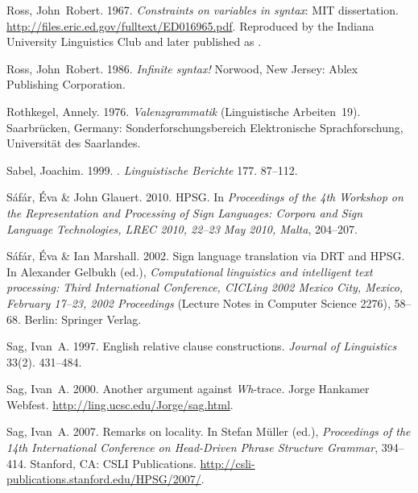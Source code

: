 \begin{thebibliography}{1420}
Ross, John~Robert. 1967.
\newblock \emph{Constraints on variables in syntax}: MIT dissertation.
\newblock \urlprefix\url{http://files.eric.ed.gov/fulltext/ED016965.pdf}.
\newblock Reproduced by the Indiana University Linguistics Club and later
  published as .

Ross, John~Robert. 1986.
\newblock \emph{Infinite syntax!}
\newblock Norwood, New Jersey: Ablex Publishing Corporation.

Rothkegel, Annely. 1976.
\newblock \emph{Valenzgrammatik} (Linguistische Arbeiten~19).
\newblock Saarbr{\"u}cken, Germany: Sonderforschungsbereich Elektronische
  Sprachforschung, Universit{\"a}t des Saarlandes.

Sabel, Joachim. 1999.
.
\newblock \emph{Linguistische Berichte} 177. 87--112.

S{\'a}f{\'a}r, {\'E}va \& John Glauert. 2010.
 {HPSG}.
\newblock In \emph{Proceedings of the {4th Workshop on the Representation and
  Processing of Sign Languages: Corpora and Sign Language Technologies, LREC
  2010, 22--23 May 2010, Malta}}, 204--207.

S{\'a}f{\'a}r, {\'E}va \& Ian Marshall. 2002.
\newblock Sign language translation via {DRT} and {HPSG}.
\newblock In Alexander Gelbukh (ed.), \emph{Computational linguistics and
  intelligent text processing: {Third International Conference, CICLing 2002
  Mexico City, Mexico, February 17--23, 2002 Proceedings}} (Lecture Notes in
  Computer Science 2276), 58--68. Berlin: Springer Verlag.

Sag, Ivan~A. 1997.
\newblock English relative clause constructions.
\newblock \emph{Journal of Linguistics} 33(2). 431--484.

Sag, Ivan~A. 2000.
\newblock Another argument against \emph{Wh}-trace.
\newblock Jorge Hankamer Webfest.
\newblock \urlprefix\url{http://ling.ucsc.edu/Jorge/sag.html}.

Sag, Ivan~A. 2007.
\newblock Remarks on locality.
\newblock In Stefan M{\"u}ller (ed.), \emph{Proceedings of the {14th
  International Conference on Head-Driven Phrase Structure Grammar}}, 394--414.
  Stanford, CA: CSLI Publications.
\newblock \urlprefix\url{http://csli-publications.stanford.edu/HPSG/2007/}.


\end{thebibliography}
